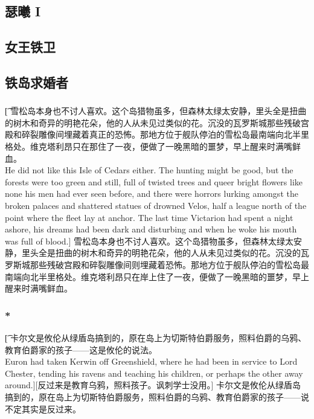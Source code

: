\documentclass[12pt,a4paper]{article}
\begin{document}
\subsection{瑟曦 I}


\subsection{女王铁卫}

\subsection{铁岛求婚者}
\subsubsection{}\t[	
	雪松岛本身也不讨人喜欢。这个岛猎物虽多，但森林太绿太安静，里头全是扭曲的树木和奇异的明艳花朵，他的人从未见过类似的花。沉没的瓦罗斯城那些残破宫殿和碎裂雕像间埋藏着真正的恐怖。那地方位于舰队停泊的雪松岛最南端向北半里格处。维克塔利昂只在那住了一夜，便做了一晚黑暗的噩梦，早上醒来时满嘴鲜血。\\
	He did not like this Isle of Cedars either. The hunting might be good, but the forests were too green and still, full of twisted trees and queer bright flowers like none his men had ever seen before, and there were horrors lurking amongst the broken palaces and shattered statues of drowned Velos, half a league north of the point where the fleet lay at anchor. The last time Victarion had spent a night ashore, his dreams had been dark and disturbing and when he woke his mouth was full of blood.]
	雪松岛本身也不讨人喜欢。这个岛猎物虽多，但森林太绿太安静，里头全是扭曲的树木和奇异的明艳花朵，他的人从未见过类似的花。沉没的瓦罗斯城那些残破宫殿和碎裂雕像间则埋藏着恐怖。那地方位于舰队停泊的雪松岛最南端向北半里格处。维克塔利昂只在岸上住了一夜，便做了一晚黑暗的噩梦，早上醒来时满嘴鲜血。
	
\subsubsection{\color{red}*}\t[	
	卡尔文是攸伦从绿盾岛搞到的，原在岛上为切斯特伯爵服务，照料伯爵的乌鸦、教育伯爵家的孩子——这是攸伦的说法。\\
	Euron had taken Kerwin off Greenshield, where he had been in service to Lord Chester, tending his ravens and teaching his children, or perhaps the other away around.][反过来是教育乌鸦，照料孩子。讽刺学士没用。]
	卡尔文是攸伦从绿盾岛搞到的，原在岛上为切斯特伯爵服务，照料伯爵的乌鸦、教育伯爵家的孩子——说不定其实是反过来。
\end{document}
